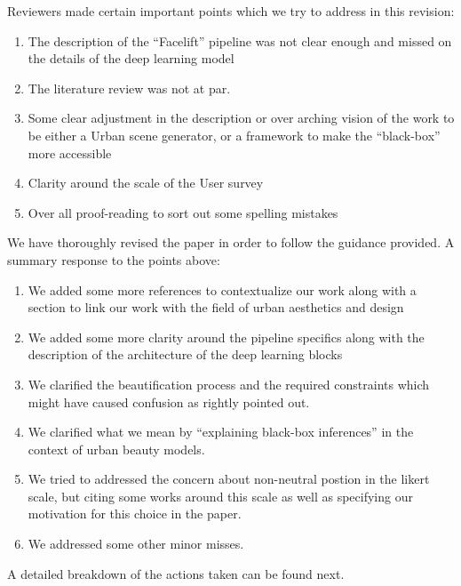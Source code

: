 \documentclass{paper}
\newenvironment{myquote}
{\definecolor{shadecolor}{rgb}{0.9,0.95,1} \begin{shaded*} \sf \em}
{\em\end{shaded*}}
\begin{document}
\begin{myquote}

\noindent Reviewers made certain important points which we try to address in this revision:

\begin{enumerate}
\item The description of the ``Facelift'' pipeline was not clear enough and missed on the details of the deep learning model
\item The literature review was not at par. 
\item Some clear adjustment in the description or over arching vision of the work to be either a Urban scene generator, or a framework to make the ``black-box'' more accessible
\item Clarity around the scale of the User survey
\item Over all proof-reading to sort out some spelling mistakes
\end{enumerate}

\noindent We have thoroughly revised the paper in order to follow the guidance provided. A summary response to the points above:

\begin{enumerate}

\item We added some more references to contextualize our work along with a section to link our work with the field of urban aesthetics and design
\item We added some more clarity around the pipeline specifics along with the description of the architecture of the deep learning blocks
\item We clarified the beautification process and the required constraints which might have caused confusion as rightly pointed out.
\item We clarified what we mean by ``explaining black-box inferences'' in the context of urban beauty models. 
\item We tried to addressed the concern about non-neutral postion in the likert scale, but citing some works around this scale as well as specifying our motivation for this choice in the paper. 
\item We addressed some other minor misses.


\end{enumerate}

\end{myquote}

A detailed breakdown of the actions taken can be found next.
\end{document}

